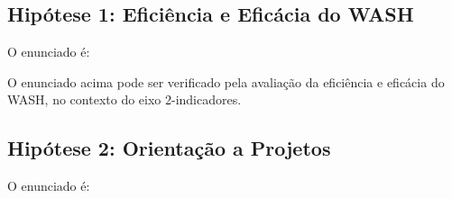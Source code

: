 \documentclass[
12pt,		%
openright,	%
twoside,  %
a4paper,			%
chapter=TITLE,		%
english,			%
french,				%
spanish,			%
brazil				%
]{USPSC-classe/USPSC}
\begin{document}
\subsection[Hip\'otese 1: Efici\^encia e Efic\'acia do WASH]{Hip\'otese 1: Efici\^encia e Efic\'acia do WASH}\label{Hip\'otese 1: Efici\^encia e Efic\'acia do WASH}
O enunciado \'e:


















\noindent\begin{center}\mbox{\centering{}}\end{center}


O enunciado acima pode ser verificado pela avalia\c{c}\~ao da efici\^encia e efic\'acia do WASH, no contexto do eixo 2-indicadores.

















\subsection[Hip\'otese 2: Orienta\c{c}\~ao a Projetos]{Hip\'otese 2: Orienta\c{c}\~ao a Projetos}\label{Hip\'otese 2: Orienta\c{c}\~ao a Projetos}
O enunciado \'e:


















\noindent\begin{center}\mbox{\centering{}}\end{center}
\end{document}
